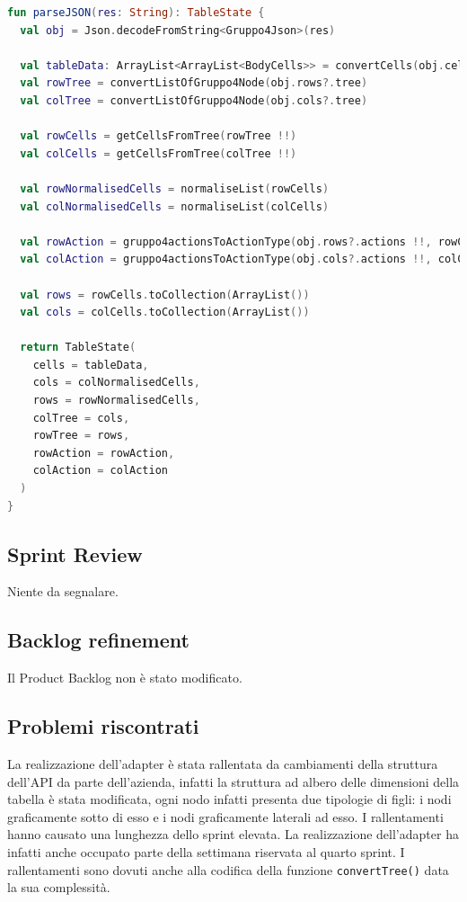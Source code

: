 \begin{lstlisting}[caption={Funzione parseJSON()}, label={lst:bodycells}, language=Kotlin]
fun parseJSON(res: String): TableState {
  val obj = Json.decodeFromString<Gruppo4Json>(res)

  val tableData: ArrayList<ArrayList<BodyCells>> = convertCells(obj.cells, obj.rows?.paths, obj.cols?.paths)!!
  val rowTree = convertListOfGruppo4Node(obj.rows?.tree)
  val colTree = convertListOfGruppo4Node(obj.cols?.tree)

  val rowCells = getCellsFromTree(rowTree !!)
  val colCells = getCellsFromTree(colTree !!)

  val rowNormalisedCells = normaliseList(rowCells)
  val colNormalisedCells = normaliseList(colCells)

  val rowAction = gruppo4actionsToActionType(obj.rows?.actions !!, rowCells.groupBy { it?.level }.size)
  val colAction = gruppo4actionsToActionType(obj.cols?.actions !!, colCells.groupBy { it?.level }.size)

  val rows = rowCells.toCollection(ArrayList())
  val cols = colCells.toCollection(ArrayList())

  return TableState(
    cells = tableData,
    cols = colNormalisedCells,
    rows = rowNormalisedCells,
    colTree = cols,
    rowTree = rows,
    rowAction = rowAction,
    colAction = colAction
  )
}
\end{lstlisting}

\subsection{Sprint Review}
Niente da segnalare.

\subsection{Backlog refinement}
Il Product Backlog non è stato modificato.

\subsection{Problemi riscontrati}
La realizzazione dell'adapter è stata rallentata da cambiamenti della struttura dell'API da parte dell'azienda, infatti la struttura ad albero delle dimensioni della tabella è stata modificata, ogni nodo infatti presenta due tipologie di figli: i nodi graficamente sotto di esso e i nodi graficamente laterali ad esso. I rallentamenti hanno causato una lunghezza dello sprint elevata. La realizzazione dell'adapter ha infatti anche occupato parte della settimana riservata al quarto sprint. I rallentamenti sono dovuti anche alla codifica della funzione \verb|convertTree()| data la sua complessità.

